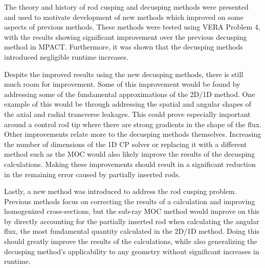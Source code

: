 The theory and history of rod cusping and decusping methods were presented and used to motivate development of new methods which improved on some aspects of previous methods.  These methods were tested using VERA Problem 4, with the results showing significant improvement over the previous decusping method in MPACT.  Furthermore, it was shown that the decusping methods introduced negligible runtime increases.

Despite the improved results using the new decusping methods, there is still much room for improvement.  Some of this improvement would be found by addressing some of the fundamental approximations of the 2D/1D method.  One example of this would be through addressing the spatial and angular shapes of the axial and radial transverse leakages.  This could prove especially important around a control rod tip where there are strong gradients in the shape of the flux.  Other improvements relate more to the decusping methods themselves.  Increasing the number of dimensions of the 1D CP solver or replacing it with a different method such as the MOC would also likely improve the results of the decusping calculations.  Making these improvements should result in a significant reduction in the remaining error caused by partially inserted rods.

Lastly, a new method was introduced to address the rod cusping problem.  Previous methods focus on correcting the results of a calculation and improving homogenized cross-sections, but the sub-ray MOC method would improve on this by directly accounting for the partially inserted rod when calculating the angular flux, the most fundamental quantity calculated in the 2D/1D method.  Doing this should greatly improve the results of the calculations, while also generalizing the decusping method's applicability to any geometry without significant increases in runtime.
